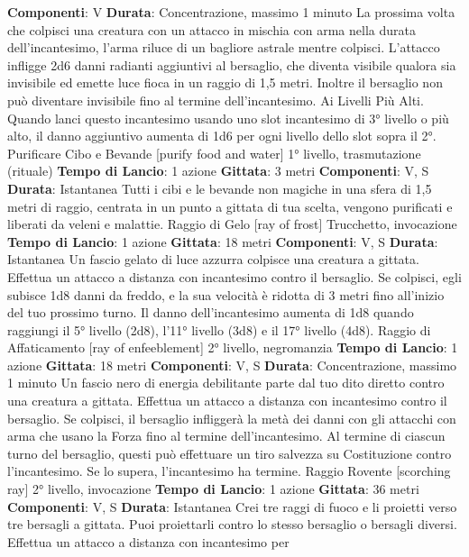 \begin{multicols}{2}
\textbf{Componenti}: V
\textbf{Durata}: Concentrazione, massimo 1 minuto
La prossima volta che colpisci una creatura con un
attacco in mischia con arma nella durata
dell’incantesimo, l’arma riluce di un bagliore astrale
mentre colpisci. L’attacco infligge 2d6 danni radianti
aggiuntivi al bersaglio, che diventa visibile qualora sia
invisibile ed emette luce fioca in un raggio di 1,5 metri.
Inoltre il bersaglio non può diventare invisibile fino al
termine dell’incantesimo.
Ai Livelli Più Alti. Quando lanci questo incantesimo
usando uno slot incantesimo di 3° livello o più alto, il
danno aggiuntivo aumenta di 1d6 per ogni livello dello
slot sopra il 2°.
Purificare Cibo e Bevande
[purify food and water]
1° livello, trasmutazione (rituale)
\textbf{Tempo di Lancio}: 1 azione
\textbf{Gittata}: 3 metri
\textbf{Componenti}: V, S
\textbf{Durata}: Istantanea
Tutti i cibi e le bevande non magiche in una sfera di 1,5
metri di raggio, centrata in un punto a gittata di tua
scelta, vengono purificati e liberati da veleni e malattie.
Raggio di Gelo
[ray of frost]
Trucchetto, invocazione
\textbf{Tempo di Lancio}: 1 azione
\textbf{Gittata}: 18 metri
\textbf{Componenti}: V, S
\textbf{Durata}: Istantanea
Un fascio gelato di luce azzurra colpisce una creatura a
gittata. Effettua un attacco a distanza con incantesimo
contro il bersaglio. Se colpisci, egli subisce 1d8 danni
da freddo, e la sua velocità è ridotta di 3 metri fino
all’inizio del tuo prossimo turno.
Il danno dell’incantesimo aumenta di 1d8 quando
raggiungi il 5° livello (2d8), l’11° livello (3d8) e il 17°
livello (4d8).
Raggio di Affaticamento
[ray of enfeeblement]
2° livello, negromanzia
\textbf{Tempo di Lancio}: 1 azione
\textbf{Gittata}: 18 metri
\textbf{Componenti}: V, S
\textbf{Durata}: Concentrazione, massimo 1 minuto
Un fascio nero di energia debilitante parte dal tuo dito
diretto contro una creatura a gittata. Effettua un attacco
a distanza con incantesimo contro il bersaglio. Se
colpisci, il bersaglio infliggerà la metà dei danni con gli
attacchi con arma che usano la Forza fino al termine
dell’incantesimo.
Al termine di ciascun turno del bersaglio, questi può
effettuare un tiro salvezza su Costituzione contro
l’incantesimo. Se lo supera, l’incantesimo ha termine.
Raggio Rovente
[scorching ray]
2° livello, invocazione
\textbf{Tempo di Lancio}: 1 azione
\textbf{Gittata}: 36 metri
\textbf{Componenti}: V, S
\textbf{Durata}: Istantanea
Crei tre raggi di fuoco e li proietti verso tre bersagli a
gittata. Puoi proiettarli contro lo stesso bersaglio o
bersagli diversi.
Effettua un attacco a distanza con incantesimo per

\end{multicols}
